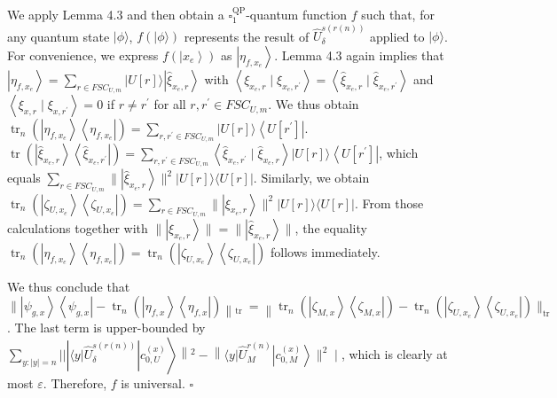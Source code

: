\documentclass[10pt]{article}
\begin{document}
We apply Lemma 4.3 and then obtain a $\square_{1}^{\mathrm{QP}}$-quantum function $f$ such that, for any quantum state $|\phi\rangle$, $f(|\phi\rangle)$ represents the result of $\widehat{U}_{\delta}^{s(r(n))}$ applied to $|\phi\rangle$. For convenience, we express $f\left(\left|x_{e}\right\rangle\right)$ as $\left|\eta_{f, x_{e}}\right\rangle$. Lemma 4.3 again implies that $\left|\eta_{f, x_{e}}\right\rangle=\sum_{r \in F S C_{U, m}}|U[r]\rangle\left|\widehat{\xi}_{x_{e}, r}\right\rangle$ with $\left\langle\xi_{x_{e}, r} \mid \xi_{x_{e}, r^{\prime}}\right\rangle=\left\langle\widehat{\xi}_{x_{e}, r} \mid \widehat{\xi}_{x_{e}, r^{\prime}}\right\rangle$ and $\left\langle\xi_{x, r} \mid \xi_{x, r^{\prime}}\right\rangle=0$ if $r \neq r^{\prime}$ for all $r, r^{\prime} \in F S C_{U, m}$. We thus obtain $\operatorname{tr}_{n}\left(\left|\eta_{f, x_{e}}\right\rangle\left\langle\eta_{f, x_{e}}\right|\right)=\sum_{r, r^{\prime} \in F S C_{U, m}}|U[r]\rangle\left\langle U\left[r^{\prime}\right]\right|$. $\operatorname{tr}\left(\left|\widehat{\xi}_{x_{e}, r}\right\rangle\left\langle\widehat{\xi}_{x_{e}, r^{\prime}}\right|\right)=\sum_{r, r^{\prime} \in F S C_{U, m}}\left\langle\widehat{\xi}_{x_{e}, r^{\prime}} \mid \widehat{\xi}_{x_{e}, r}\right\rangle|U[r]\rangle\left\langle U\left[r^{\prime}\right]\right|$, which equals $\sum_{r \in F S C_{U, m}} \|\left|\widehat{\xi}_{x_{e}, r}\right\rangle \|^{2}|U[r]\rangle\langle U[r]|$. Similarly, we obtain $\operatorname{tr}_{n}\left(\left|\zeta_{U, x_{e}}\right\rangle\left\langle\zeta_{U, x_{e}}\right|\right)=\sum_{r \in F S C_{U, m}} \|\left|\xi_{x_{e}, r}\right\rangle \|^{2}|U[r]\rangle\langle U[r]|$. From those calculations together with $\|\left|\xi_{x_{e}, r}\right\rangle\|=\|\left|\widehat{\xi}_{x_{e}, r}\right\rangle \|$, the equality $\operatorname{tr}_{n}\left(\left|\eta_{f, x_{e}}\right\rangle\left\langle\eta_{f, x_{e}}\right|\right)=\operatorname{tr}_{n}\left(\left|\zeta_{U, x_{e}}\right\rangle\left\langle\zeta_{U, x_{e}}\right|\right)$ follows immediately.

We thus conclude that $\|\left|\psi_{g, x}\right\rangle\left\langle\psi_{g, x}\right|-\operatorname{tr}_{n}\left(\left|\eta_{f, x}\right\rangle\left\langle\eta_{f, x}\right|\right)\left\|_{\text {tr }}=\right\| \operatorname{tr}_{n}\left(\left|\zeta_{M, x}\right\rangle\left\langle\zeta_{M, x}\right|\right)-\operatorname{tr}_{n}\left(\left|\zeta_{U, x_{e}}\right\rangle\left\langle\zeta_{U, x_{e}}\right|\right) \|_{\text {tr }}$. The last term is upper-bounded by $\left.\sum_{y:|y|=n}| |\left|\langle y| \widehat{U}_{\delta}^{s(r(n))}\right| c_{0, U}^{(x)}\right\rangle\left\|^{2}-\right\|\langle y| \widehat{U}_{M}^{r(n)}\left|c_{0, M}^{(x)}\right\rangle \|^{2} \mid$, which is clearly at most $\varepsilon$. Therefore, $f$ is universal. \(\square\)
\end{document}
